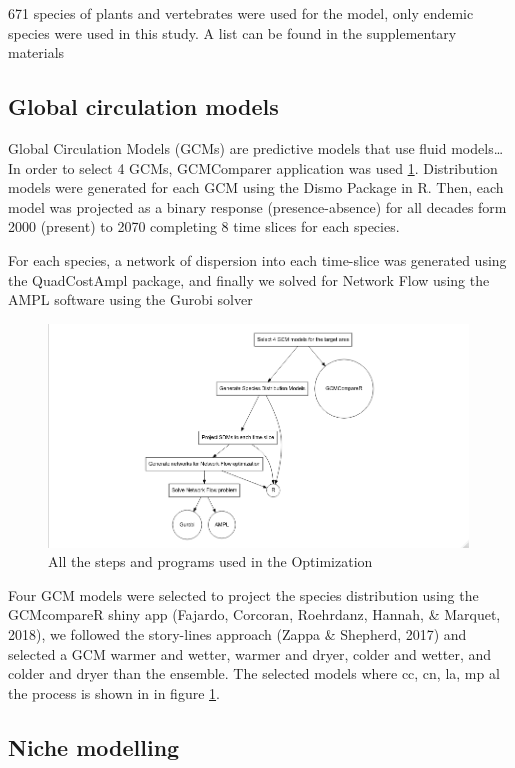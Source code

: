 \documentclass[]{article}
\begin{document}
671 species of plants and vertebrates were used for the model, only endemic species were used in this study. A list can be found in the supplementary materials

\hypertarget{global-circulation-models}{%
\subsection{Global circulation models}\label{global-circulation-models}}

Global Circulation Models (GCMs) are predictive models that use fluid models\ldots{} In order to select 4 GCMs, GCMComparer application was used \ref{fig:Diagrama}. Distribution models were generated for each GCM using the Dismo Package in R. Then, each model was projected as a binary response (presence-absence) for all decades form 2000 (present) to 2070 completing 8 time slices for each species.

For each species, a network of dispersion into each time-slice was generated using the QuadCostAmpl package, and finally we solved for Network Flow using the AMPL software using the Gurobi solver

\begin{figure}
\includegraphics[width=4.39in]{Diag1} \caption{All the steps and programs used in the Optimization}\label{fig:Diagrama}
\end{figure}

Four GCM models were selected to project the species distribution using the GCMcompareR shiny app (Fajardo, Corcoran, Roehrdanz, Hannah, \& Marquet, 2018), we followed the story-lines approach (Zappa \& Shepherd, 2017) and selected a GCM warmer and wetter, warmer and dryer, colder and wetter, and colder and dryer than the ensemble. The selected models where cc, cn, la, mp al the process is shown in in figure \ref{fig:Diagrama}.

\hypertarget{niche-modelling}{%
\subsection{Niche modelling}\label{niche-modelling}}
\end{document}
